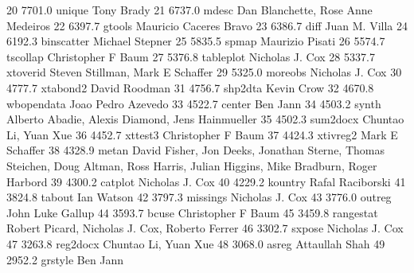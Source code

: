     20   7701.0    unique        Tony Brady                              
    21   6737.0    mdesc         Dan Blanchette, Rose Anne Medeiros      
    22   6397.7    gtools        Mauricio Caceres Bravo                  
    23   6386.7    diff          Juan M. Villa                           
    24   6192.3    binscatter    Michael Stepner                         
    25   5835.5    spmap         Maurizio Pisati                         
    26   5574.7    tscollap      Christopher F Baum                      
    27   5376.8    tableplot     Nicholas J. Cox                         
    28   5337.7    xtoverid      Steven Stillman, Mark E Schaffer        
    29   5325.0    moreobs       Nicholas J. Cox                         
    30   4777.7    xtabond2      David Roodman                           
    31   4756.7    shp2dta       Kevin Crow                              
    32   4670.8    wbopendata    Joao Pedro Azevedo                      
    33   4522.7    center        Ben Jann                                
    34   4503.2    synth         Alberto Abadie, Alexis Diamond, Jens    
                                   Hainmueller                             
    35   4502.3    sum2docx      Chuntao Li, Yuan Xue                    
    36   4452.7    xttest3       Christopher F Baum                      
    37   4424.3    xtivreg2      Mark E Schaffer                         
    38   4328.9    metan         David Fisher, Jon Deeks, Jonathan       
                                   Sterne, Thomas Steichen, Doug Altman,   
                                   Ross Harris, Julian Higgins, Mike       
                                   Bradburn, Roger Harbord                 
    39   4300.2    catplot       Nicholas J. Cox                         
    40   4229.2    kountry       Rafal Raciborski                        
    41   3824.8    tabout        Ian Watson                              
    42   3797.3    missings      Nicholas J. Cox                         
    43   3776.0    outreg        John Luke Gallup                        
    44   3593.7    bcuse         Christopher F Baum                      
    45   3459.8    rangestat     Robert Picard, Nicholas J. Cox, Roberto 
                                   Ferrer                                  
    46   3302.7    sxpose        Nicholas J. Cox                         
    47   3263.8    reg2docx      Chuntao Li, Yuan Xue                    
    48   3068.0    asreg         Attaullah Shah                          
    49   2952.2    grstyle       Ben Jann                                
